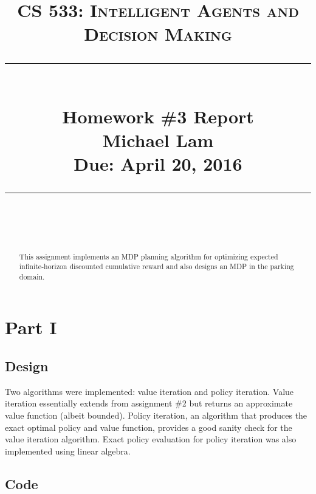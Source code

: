 \documentclass[paper=a4, fontsize=11pt]{scrartcl}
\newcommand{\lecture}{Homework \#3 Report} %
\newcommand{\lecturedate}{Due: April 20, 2016} %
\newcommand{\scribe}{Michael Lam} %
\begin{document}
\newcommand{\horrule}[1]{\rule{\linewidth}{#1}} %

\title{	
\normalfont \normalsize
\vspace{-30pt}
\textsc{CS 533: Intelligent Agents and Decision Making} \\ [10pt]
\horrule{0.5pt} \\[0.4cm] %
\LARGE \lecture\\ %
\vspace{5pt}
\normalsize \scribe\\
\lecturedate\\
\horrule{2pt} \\[0.5cm] %
}


\date{} %

\maketitle
\vspace{-100pt}

\begin{abstract}
This assignment implements an MDP planning algorithm for optimizing expected infinite-horizon discounted cumulative reward and also designs an MDP in the parking domain.
\end{abstract}

\section{Part I}

\subsection{Design}

Two algorithms were implemented: value iteration and policy iteration. Value iteration essentially extends from assignment \#2 but returns an approximate value function (albeit bounded). Policy iteration, an algorithm that produces the exact optimal policy and value function, provides a good sanity check for the value iteration algorithm. Exact policy evaluation for policy iteration was also implemented using linear algebra.

\subsection{Code}
\end{document}
